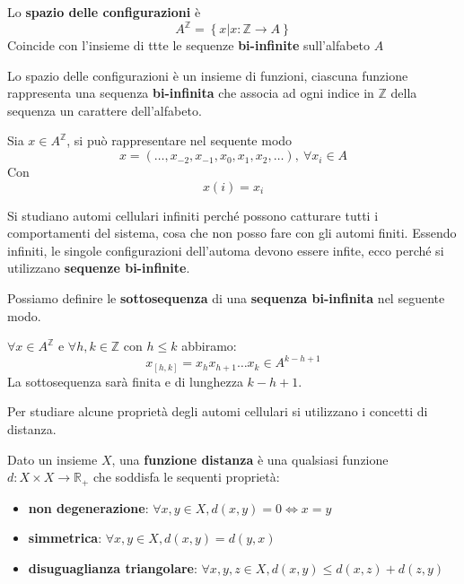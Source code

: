 \begin{definizione}
    Lo \textbf{spazio delle configurazioni} è
    $$A^\mathbb{Z}= \left\{x|x:\mathbb{Z}\rightarrow A\right\}$$
    Coincide con l'insieme di ttte le sequenze \textbf{bi-infinite} sull'alfabeto
    $A$
\end{definizione}
Lo spazio delle configurazioni è un insieme di funzioni, ciascuna funzione rappresenta
una sequenza \textbf{bi-infinita} che associa ad ogni indice in $\mathbb{Z}$ della
sequenza un carattere dell'alfabeto.
\begin{esempio}
    Sia $x\in A^\mathbb{Z}$, si può rappresentare nel sequente modo
    $$x = \left(\dots, x_{-2}, x_{-1},x_{0},x_{1},x_{2},\dots\right), \ \forall x_i\in A$$
    Con
    $$x(i) = x_i$$
\end{esempio}

Si studiano automi cellulari infiniti perché possono catturare tutti i comportamenti
del sistema, cosa che non posso fare con gli automi finiti. Essendo infiniti,
le singole configurazioni dell'automa devono essere infite, ecco perché si utilizzano
\textbf{sequenze bi-infinite}.

\begin{definizione} 
    Possiamo definire le \textbf{sottosequenza} di una \textbf{sequenza bi-infinita}
    nel seguente modo.

    $\forall x \in A^{\mathbb{Z}}$ e $\forall h,k\in \mathbb{Z}$ con $h\le k$
    abbiramo:
    $$x_{[h,k]}= x_hx_{h+1}\dots x_k\in A^{k-h+1}$$
    La sottosequenza sarà finita e di lunghezza $k-h+1$.
\end{definizione}

Per studiare alcune proprietà degli automi cellulari si utilizzano i concetti di
distanza.
\begin{definizione}
    Dato un insieme $X$, una \textbf{funzione distanza} è una qualsiasi funzione
    $d:X\times X \rightarrow \mathbb{R}_+$ che soddisfa le sequenti proprietà:
    \begin{itemize}
        \item \textbf{non degenerazione}: $\forall x,y\in X, d(x,y) = 0\iff x=y$
        \item \textbf{simmetrica}: $\forall x,y\in X, d(x,y) = d(y,x)$
        \item \textbf{disuguaglianza triangolare}: $\forall x,y,z\in X, d(x,y) \le d(x,z)+d(z,y)$
    \end{itemize}
\end{definizione}

